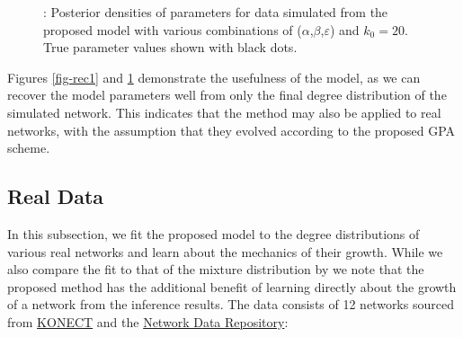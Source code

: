 \documentclass[
  sn-basic,
  10pt,
]{sn-jnl}
\theoremstyle{plain}
\theoremstyle{plain}
\theoremstyle{remark}
\begin{document}
\begin{figure}


\caption{\label{fig-rec2}: Posterior densities of parameters for data
simulated from the proposed model with various combinations of
(\(\alpha\),\(\beta\),\(\varepsilon\)) and \(k_0=20\). True parameter
values shown with black dots.}

\end{figure}%

Figures \ref{fig-rec1} and \ref{fig-rec2} demonstrate the usefulness of
the model, as we can recover the model parameters well from only the
final degree distribution of the simulated network. This indicates that
the method may also be applied to real networks, with the assumption
that they evolved according to the proposed GPA scheme.

\subsection{Real Data}\label{sec-real}

In this subsection, we fit the proposed model to the degree
distributions of various real networks and learn about the mechanics of
their growth. While we also compare the fit to that of the mixture
distribution by \citet{Lee24} we note that the proposed method has the
additional benefit of learning directly about the growth of a network
from the inference results. The data consists of 12 networks sourced
from \href{konect.cc}{KONECT} and the
\href{https://networkrepository.com}{Network Data Repository}\citep{nr}:
\end{document}
